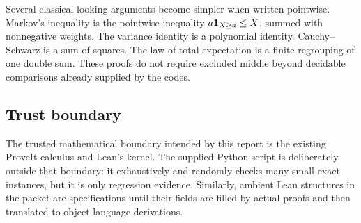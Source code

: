 Several classical-looking arguments become simpler when written pointwise.
Markov's inequality is the pointwise inequality
\(a\mathbf 1_{X\ge a}\le X\), summed with nonnegative weights.  The variance identity
is a polynomial identity.  Cauchy--Schwarz is a sum of squares.  The law of
total expectation is a finite regrouping of one double sum.  These proofs do
not require excluded middle beyond decidable comparisons already supplied by
the codes.

\subsection{Trust boundary}

The trusted mathematical boundary intended by this report is the existing
ProveIt calculus  and Lean's kernel.  The supplied Python script
is deliberately outside that boundary: it exhaustively and randomly checks
many small exact instances, but it is only regression evidence.  Similarly,
ambient Lean structures in the packet are specifications until their fields
are filled by actual proofs and then translated to object-language derivations.
